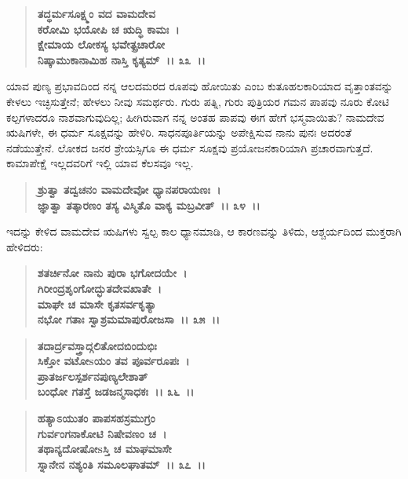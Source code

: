 \begin{verse}
\textbf{ತದ್ಧರ್ಮಸೂಕ್ಷ್ಮಂ ವದ ವಾಮದೇವ}\\\textbf{ಕರೋಮಿ ಭಯೋಪಿ ಚ ಋದ್ಧಿ ಕಾಮಃ~। }\\\textbf{ಕ್ಷೇಮಾಯ ಲೋಕಸ್ಯ ಭವೇತ್ಪ್ರಚಾರೋ} \\\textbf{ನಿಷ್ಕಾಮುಕಾನಾಮಿಹ ನಾಸ್ತಿ ಕೃತ್ಯಮ್~।। ೩೩~।।}
\end{verse}

ಯಾವ ಪುಣ್ಯ ಪ್ರಭಾವದಿಂದ ನನ್ನ ಆಲದಮರದ ರೂಪವು ಹೋಯಿತು ಎಂಬ ಕುತೂಹಲಕಾರಿಯಾದ ವೃತ್ತಾಂತವನ್ನು ಕೇಳಲು ಇಚ್ಛಿಸುತ್ತೇನೆ; ಹೇಳಲು ನೀವು ಸಮರ್ಥರು. ಗುರು ಪತ್ನಿ, ಗುರು ಪುತ್ರಿಯರ ಗಮನ ಪಾಪವು ನೂರು ಕೋಟಿ ಕಲ್ಪಗಳಾದರೂ ನಾಶವಾಗುವುದಿಲ್ಲ; ಹೀಗಿರುವಾಗ ನನ್ನ ಅಂತಹ ಪಾಪವು ಈಗ ಹೇಗೆ ಭಸ್ಮವಾಯಿತು? ನಾಮದೇವ ಋಷಿಗಳೇ, ಈ ಧರ್ಮ ಸೂಕ್ಷವನ್ನು ಹೇಳಿರಿ. ಸಾಧನಪೂರ್ತಿಯನ್ನು ಅಪೇಕ್ಷಿಸುವ ನಾನು ಪುನಃ ಅದರಂತೆ ನಡೆಯುತ್ತೇನೆ. ಲೋಕದ ಜನರ ಶ್ರೇಯಸ್ಸಿಗೂ ಈ ಧರ್ಮ ಸೂಕ್ಷವು ಪ್ರಯೋಜನಕಾರಿಯಾಗಿ ಪ್ರಚಾರವಾಗುತ್ತದೆ. ಕಾಮಾಪೇಕ್ಷೆ ಇಲ್ಲದವರಿಗೆ ಇಲ್ಲಿ ಯಾವ ಕೆಲಸವೂ ಇಲ್ಲ.

\begin{verse}
\textbf{ಶ್ರುತ್ವಾ ತದ್ವಚನಂ ವಾಮದೇವೋ ಧ್ಯಾನಪರಾಯಣಃ~।}\\\textbf{ಜ್ಞಾತ್ವಾ ತತ್ಕಾರಣಂ ತಸ್ಯ ವಿಸ್ಮಿತೊ ವಾಕ್ಯ ಮಬ್ರವೀತ್~।। ೩೪~।।}
\end{verse}

ಇದನ್ನು ಕೇಳಿದ ವಾಮದೇವ ಋಷಿಗಳು ಸ್ವಲ್ಪ ಕಾಲ ಧ್ಯಾನಮಾಡಿ, ಆ ಕಾರಣವನ್ನು ತಿಳಿದು, ಆಶ್ಚರ್ಯದಿಂದ ಮುಕ್ತರಾಗಿ ಹೇಳಿದರು:

\begin{verse}
\textbf{ಶತರ್ಚಿನೋ ನಾನು ಪುರಾ ಭಗೋದಯೇ~।}\\\textbf{ಗಿರೀಂದ್ರಶೃಂಗೋದ್ಭುತದೇವಖಾತೇ~। }\\\textbf{ಮಾಘೇ ಚ ಮಾಸೇ ಕೃತಸರ್ವಕೃತ್ಯಾ} \\\textbf{ನಭೋ ಗತಾಃ ಸ್ವಾಶ್ರಮಮಾಪುರೋಜಸಾ~।। ೩೫~।। }
\end{verse}

\begin{verse}
\textbf{ತದಾರ್ದ್ರವಸ್ತ್ರಾದ್ಗಲಿತೋದಬಿಂದುಭಿಃ}\\\textbf{ಸಿಕ್ತೋ ವಟೋsಯಂ ತವ ಪೂರ್ವರೂಪಃ~। }\\\textbf{ಪ್ರಾತರ್ಜಲಸ್ಪರ್ಶನಪುಣ್ಯಲೇಶಾತ್} \\\textbf{ಬಂಧೋ ಗತಸ್ತೆ ಜಡಜನ್ಮಸಾಧಕಃ~।। ೩೬~।।}
\end{verse}

\begin{verse}
\textbf{ಹತ್ಯಾಽಯುತಂ ಪಾಪಸಹಸ್ರಮುಗ್ರಂ}\\\textbf{ಗುರ್ವಂಗನಾಕೋಟಿ ನಿಷೇವಣಂ ಚ~।}\\\textbf{ತಥಾನ್ಯದೋಷೋsಸ್ತಿ ಚ ಮಾಘಮಾಸೇ} \\\textbf{ಸ್ನಾನೇನ ನಶ್ಯಂತಿ ಸಮೂಲಘಾತಮ್~।। ೩೭~।।}
\end{verse}

